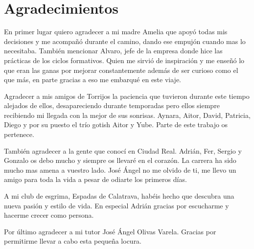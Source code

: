\chapter{Agradecimientos}

En primer lugar quiero agradecer a mi madre Amelia que apoyó todas mis decisiones
y me acompañó durante el camino, dando ese empujón cuando mas lo necesitaba. También
mencionar Alvaro, jefe de la empresa donde hice las prácticas de los ciclos formativos. Quien me sirvió de inspiración y me enseñó lo que eran las ganas
por mejorar constantemente además de ser curioso como el que más, en parte gracias a eso me embarqué en este viaje.

Agradecer a mis amigos de Torrijos la paciencia que tuvieron durante este tiempo
alejados de ellos, desapareciendo durante temporadas pero ellos siempre recibiendo mi llegada con la mejor de sus sonrisas. Aynara, Aitor, David, Patricia, Diego y por su puesto el trío gotish Aitor y Yube. Parte de este trabajo os pertenece.

También agradecer a la gente que conocí en Ciudad Real. Adrián, Fer, Sergio y Gonzalo os debo mucho y siempre os llevaré en el corazón. La carrera ha sido mucho mas amena a vuestro lado. José Ángel no me olvido de ti, me llevo un amigo para toda la vida a pesar de odiarte los primeros días.

A mi club de esgrima, Espadas de Calatrava, habéis hecho que descubra una nueva pasión y estilo de vida. En especial Adrián gracias por escucharme y hacerme crecer como persona.

Por último agradecer a mi tutor José Ángel Olivas Varela. Gracias por permitirme llevar a cabo esta pequeña locura.


